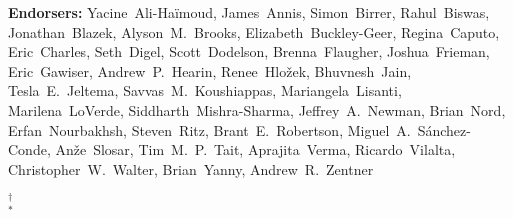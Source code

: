 \begin{raggedright}
\textbf{Endorsers:}
Yacine~Ali-Ha\"imoud,
James~Annis,
Simon~Birrer,
Rahul~Biswas,
Jonathan~Blazek,
Alyson~M.~Brooks,
Elizabeth~Buckley-Geer,
Regina~Caputo,
Eric~Charles,
Seth~Digel,
Scott~Dodelson,
Brenna~Flaugher,
Joshua~Frieman,
Eric~Gawiser,
Andrew~P.~Hearin,
Renee~Hlo\v{z}ek,
Bhuvnesh~Jain,
Tesla~E.~Jeltema,
Savvas~M.~Koushiappas,
Mariangela~Lisanti,
Marilena~LoVerde,
Siddharth~Mishra-Sharma,
Jeffrey~A.~Newman,
Brian~Nord,
Erfan~Nourbakhsh,
Steven~Ritz,
Brant~E.~Robertson,
Miguel~A.~S\'anchez-Conde,
An\v{z}e~Slosar,
Tim~M.~P.~Tait,
Aprajita~Verma,
Ricardo~Vilalta,
Christopher~W.~Walter,
Brian~Yanny,
Andrew~R.~Zentner



$^\dagger$  \\
$^*$ 

\begin{multicols}{2}
\scriptsize
\parskip=4pt


\end{multicols}
\end{raggedright}
